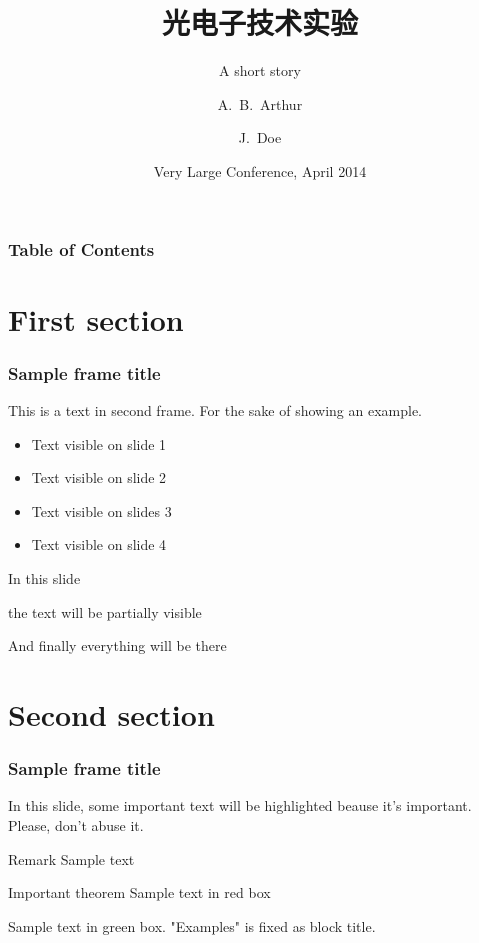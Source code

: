 \documentclass{beamer}
\title[About Beamer] %
{光电子技术实验}
\subtitle{A short story}
\author[Arthur, Doe] %
{A.~B.~Arthur\inst{1} \and J.~Doe\inst{2}}
\institute[VFU] %
{
  \inst{1}%
  Faculty of Physics\\
  Very Famous University
  \and
  \inst{2}%
  Faculty of Chemistry\\
  Very Famous University
}
\date[VLC 2014] %
{Very Large Conference, April 2014}
\begin{document}
\frame{\titlepage}


\begin{frame}
\frametitle{Table of Contents}
\tableofcontents
\end{frame}


\section{First section}

\begin{frame}
\frametitle{Sample frame title}
This is a text in second frame. For the sake of showing an example.

\begin{itemize}
    \item<1-> Text visible on slide 1
    \item<2-> Text visible on slide 2
    \item<3> Text visible on slides 3
    \item<4-> Text visible on slide 4
\end{itemize}
\end{frame}



\begin{frame}
In this slide \pause

the text will be partially visible \pause

And finally everything will be there
\end{frame}

\section{Second section}

\begin{frame}
\frametitle{Sample frame title}

In this slide, some important text will be
\alert{highlighted} beause it's important.
Please, don't abuse it.

\begin{block}{Remark}
Sample text
\end{block}

\begin{alertblock}{Important theorem}
Sample text in red box
\end{alertblock}

\begin{examples}
Sample text in green box. "Examples" is fixed as block title.
\end{examples}
\end{frame}
\end{document}
